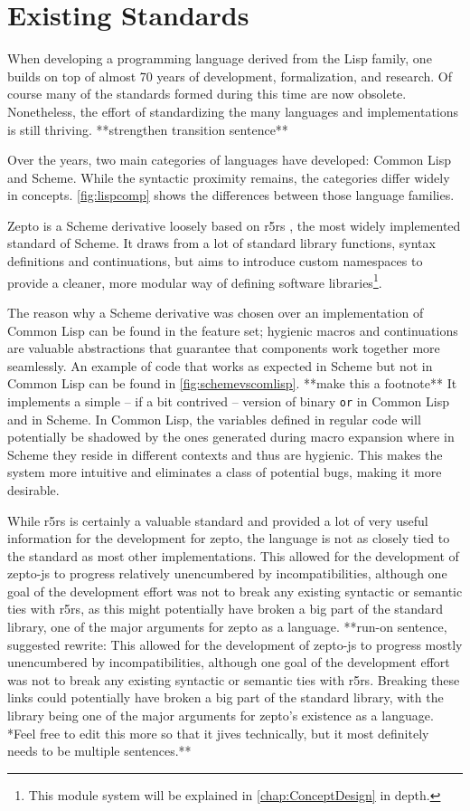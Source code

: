 \documentclass[oneside,11pt,xetex]{scrbook}
\begin{document}
\section{Existing Standards}
\label{sec:ExistingStandards}

When developing a programming language derived from the Lisp family, one builds on
top of almost 70 years of development, formalization, and research. Of course
many of the standards formed during this time are now obsolete.
Nonetheless, the effort of standardizing the many languages and implementations
is still thriving. **strengthen transition sentence**

Over the years, two main categories of languages have developed: Common Lisp
and Scheme. While the syntactic proximity remains, the categories differ widely in
concepts. \ref{fig:lispcomp} shows the differences between those language families.

Zepto is a Scheme derivative loosely based on \gls{r5rs} \parencite{R5RS}, the most
widely implemented standard of Scheme. It draws from a lot of standard library
functions, syntax definitions and continuations, but aims to introduce custom namespaces
to provide a cleaner, more modular way of defining software libraries\footnote{This module
system will be explained in \ref{chap:ConceptDesign} in depth.}.

The reason why a Scheme derivative was chosen over an implementation of Common Lisp can be
found in the feature set; hygienic macros and continuations are valuable abstractions that
guarantee that components work together more seamlessly. An example of code that works as
expected in Scheme but not in Common Lisp can be found in \ref{fig:schemevscomlisp}. **make this a footnote** It
implements a simple – if a bit contrived – version of binary \texttt{or} in Common Lisp and
in Scheme. In Common Lisp, the variables defined in regular code will potentially be
shadowed by the ones generated during macro expansion where in Scheme they reside in
different contexts and thus are hygienic. This makes the system more intuitive and eliminates
a class of potential bugs, making it more desirable.

While \gls{r5rs} is certainly a valuable standard and provided a lot of very useful information
for the development for zepto, the language is not as closely tied to the standard as most other
implementations. This allowed for the development of zepto-js to progress relatively unencumbered
by incompatibilities, although one goal of the development effort was not to break any existing
syntactic or semantic ties with \gls{r5rs}, as this might potentially have broken a big part of
the standard library, one of the major arguments for zepto as a language. **run-on sentence, suggested rewrite: This allowed for the development of zepto-js to progress mostly unencumbered by incompatibilities, although one goal of the development effort was not to break any existing syntactic or semantic ties with \gls{r5rs}. Breaking these links could potentially have broken a big part of the standard library, with the library being one of the major arguments for zepto's existence as a language. *Feel free to edit this more so that it jives technically, but it most definitely needs to be multiple sentences.** 
\end{document}
